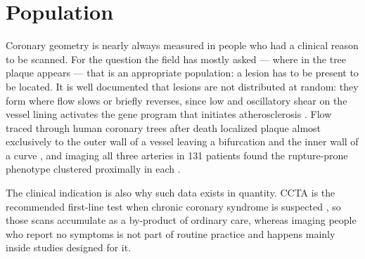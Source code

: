 %
\section*{Population}


Coronary geometry is nearly always measured in people who had a clinical reason to be scanned. For the question the field has mostly asked --- where in the tree plaque appears --- that is an
appropriate population: a lesion has to be present to be located.
It is well documented that lesions are not distributed at random: they form where flow slows or briefly reverses, since low and
oscillatory shear on the vessel lining activates the gene program that initiates atherosclerosis
\cite{chatzizisis2007ess}.
Flow traced through human coronary trees after death localized plaque almost exclusively to the
outer wall of a vessel leaving a bifurcation and the inner wall of a curve \cite{asakura1990flow},
and imaging all three arteries in 131 patients found the rupture-prone phenotype clustered
proximally in each \cite{araki2020plaques}.


The clinical indication is also why such data exists in quantity.
CCTA is the recommended first-line test when chronic coronary syndrome is suspected
\cite{knuuti2019esc}, so those scans accumulate as a by-product of ordinary care, whereas imaging
people who report no symptoms is not part of routine practice and happens mainly inside studies
designed for it.

